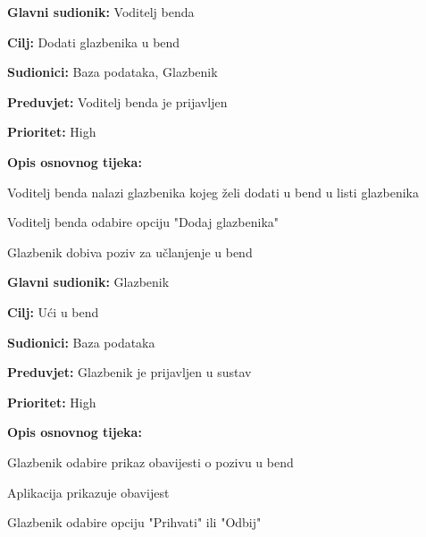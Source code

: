 \noindent {}
	\begin{packed_item}
		
		\item \textbf{Glavni sudionik:} Voditelj benda
		\item \textbf{Cilj:} Dodati glazbenika u bend
		\item \textbf{Sudionici:} Baza podataka, Glazbenik
		\item \textbf{Preduvjet:} Voditelj benda je prijavljen 
		\item \textbf{Prioritet:} High
		\item \textbf{Opis osnovnog tijeka:} 
		
		\item[] \begin{packed_enum}
			\item Voditelj benda nalazi glazbenika kojeg želi dodati u bend u listi glazbenika
			\item Voditelj benda odabire opciju "Dodaj glazbenika" 
			\item Glazbenik dobiva poziv za učlanjenje u bend
		\end{packed_enum}
		
	\end{packed_item}	

\noindent {}
	\begin{packed_item}
		
		\item \textbf{Glavni sudionik:} Glazbenik
		\item \textbf{Cilj: } Ući u bend
		\item \textbf{Sudionici:} Baza podataka
		\item \textbf{Preduvjet:} Glazbenik je prijavljen u sustav
		\item \textbf{Prioritet:} High
		\item \textbf{Opis osnovnog tijeka:} 
		
		\item[] \begin{packed_enum}
			
			\item Glazbenik odabire prikaz obavijesti o pozivu u bend
			\item Aplikacija prikazuje obavijest
			\item Glazbenik odabire opciju "Prihvati" ili "Odbij"
		\end{packed_enum}
		
	\end{packed_item}
		
